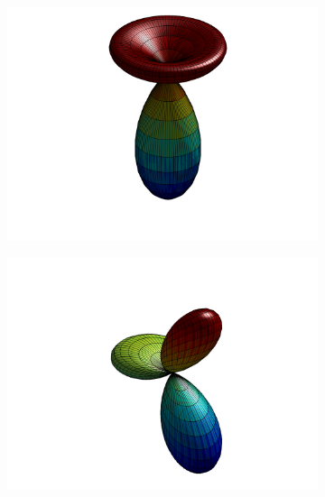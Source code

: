 \begin{figure}
\label{fig::Sn_Y3}
\centering
	\begin{subfigure}[b]{0.40\textwidth}
		\centering
		\includegraphics[width=\textwidth]{figures/appendices/Y_3_0.png}
		\caption{}
	\end{subfigure}
	\vfill
	\begin{subfigure}[b]{0.40\textwidth}
		\centering
		\includegraphics[width=\textwidth]{figures/appendices/Y_3_-1.png}
		\caption{}
	\end{subfigure}
	\hfill
	\begin{subfigure}[b]{0.40\textwidth}
		\centering

\end{subfigure}
\end{figure}
